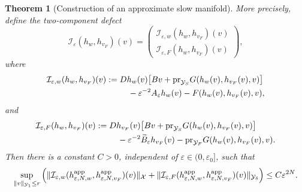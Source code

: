 \documentclass[11pt]{article}
\newtheorem{theorem}{Theorem}[section]
\theoremstyle{definition}
\theoremstyle{remark}
\numberwithin{equation}{section}
\newcommand{\mc}[1]{\mathcal{#1}}
\newcommand{\pr}{\textnormal{pr}}
\begin{document}
\begin{theorem}[Construction of an approximate slow manifold]
More precisely, define the two-component defect
\[
\mathcal I_\varepsilon(h_w,h_{v_F})(v)
=
\begin{pmatrix}
\mathcal I_{\varepsilon,w}(h_w,h_{v_F})(v)\\[1mm]
\mathcal I_{\varepsilon,F}(h_w,h_{v_F})(v)
\end{pmatrix},
\]
where
\[
\begin{aligned}
\mathcal I_{\varepsilon,w}(h_w,h_{v_F})(v)
:={}&
Dh_w(v)
\big[
Bv+\pr_{\mc Y_S}G(h_w(v),h_{v_F}(v),v)
\big]
\\
&\quad
-\varepsilon^{-2}A_\varepsilon h_w(v)
-
F(h_w(v),h_{v_F}(v),v),
\end{aligned}
\]
and
\[
\begin{aligned}
\mathcal I_{\varepsilon,F}(h_w,h_{v_F})(v)
:={}&
Dh_{v_F}(v)
\big[
Bv+\pr_{\mc Y_S}G(h_w(v),h_{v_F}(v),v)
\big]
\\
&\quad
-\varepsilon^{-2}\widetilde B_\varepsilon h_{v_F}(v)
-
\pr_{\mc Y_F}G(h_w(v),h_{v_F}(v),v).
\end{aligned}
\]
Then there is a constant \(C>0\), independent of
\(\varepsilon\in(0,\varepsilon_0]\), such that
\[
\sup_{\|v\|_{\mc Y_1}\le r}
\left(
\|\mathcal I_{\varepsilon,w}
(h_{\varepsilon,N,w}^{\rm app},h_{\varepsilon,N,v_F}^{\rm app})(v)\|_{\mc X}
+
\|\mathcal I_{\varepsilon,F}
(h_{\varepsilon,N,w}^{\rm app},h_{\varepsilon,N,v_F}^{\rm app})(v)\|_{\mc Y_\delta}
\right)
\le
C\varepsilon^{2N}.
\]


\end{theorem}
\end{document}

